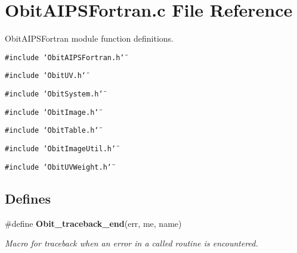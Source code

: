 \section{Obit\-AIPSFortran.c File Reference}
\label{ObitAIPSFortran_8c}
Obit\-AIPSFortran module function definitions. 

{\tt \#include \char`\"{}Obit\-AIPSFortran.h\char`\"{}}\par
{\tt \#include \char`\"{}Obit\-UV.h\char`\"{}}\par
{\tt \#include \char`\"{}Obit\-System.h\char`\"{}}\par
{\tt \#include \char`\"{}Obit\-Image.h\char`\"{}}\par
{\tt \#include \char`\"{}Obit\-Table.h\char`\"{}}\par
{\tt \#include \char`\"{}Obit\-Image\-Util.h\char`\"{}}\par
{\tt \#include \char`\"{}Obit\-UVWeight.h\char`\"{}}\par
\subsection*{Defines}
\begin{CompactItemize}
\item 
\#define {\bf Obit\_\-traceback\_\-end}(err, me, name)
\begin{CompactList}\small\item\em Macro for traceback when an error in a called routine is encountered. \item\end{CompactList}\end{CompactItemize}
